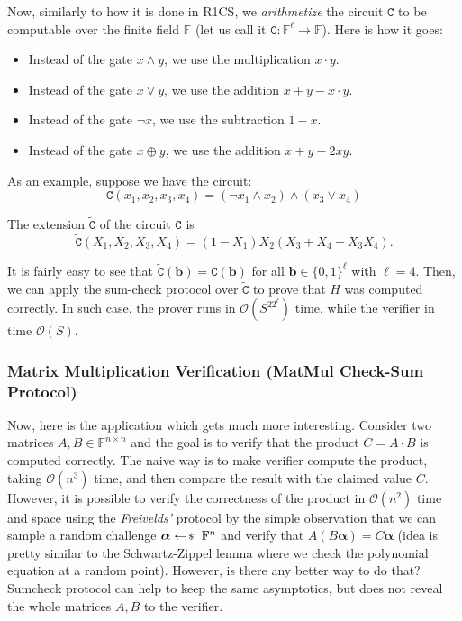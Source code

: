 \documentclass[../../book.tex]{subfiles}
\begin{document}
Now, similarly to how it is done in R1CS, we \textit{arithmetize} the circuit
$\mathtt{C}$ to be computable over the finite field $\mathbb{F}$ (let us call it
$\widetilde{\mathtt{C}}: \mathbb{F}^{\ell} \to \mathbb{F}$). Here is how it goes:
\begin{itemize}
    \item Instead of the gate $x \wedge y$, we use the multiplication $x \cdot y$.
    \item Instead of the gate $x \vee y$, we use the addition $x + y - x \cdot y$.
    \item Instead of the gate $\neg x$, we use the subtraction $1 - x$.
    \item Instead of the gate $x \oplus y$, we use the addition $x + y - 2xy$.
\end{itemize}

As an example, suppose we have the circuit:
\begin{equation*}
    \mathtt{C}(x_1,x_2,x_3,x_4) = (\neg x_1 \wedge x_2) \wedge (x_3 \vee x_4)
\end{equation*}

The extension $\widetilde{\mathtt{C}}$ of the circuit $\mathtt{C}$ is
\begin{equation*}
    \widetilde{\mathtt{C}}(X_1,X_2,X_3,X_4) = (1 - X_1)X_2(X_3 + X_4 - X_3X_4).
\end{equation*}

It is fairly easy to see that $\widetilde{\mathtt{C}}(\boldsymbol{b}) =
\mathtt{C}(\boldsymbol{b})$ for all $\boldsymbol{b} \in \{0,1\}^{\ell}$ with
$\ell=4$. Then, we can apply the sum-check protocol over
$\widetilde{\mathtt{C}}$ to prove that $H$ was computed correctly. In such case,
the prover runs in $\mathcal{O}(S^22^{\ell})$ time, while the verifier in time
$\mathcal{O}(S)$. 

\subsubsection{Matrix Multiplication Verification (MatMul Check-Sum Protocol)}

Now, here is the application which gets much more interesting. Consider two
matrices $A, B \in \mathbb{F}^{n \times n}$ and the goal is to verify that the
product $C = A \cdot B$ is computed correctly. The naive way is to make verifier
compute the product, taking $\mathcal{O}(n^3)$ time, and then compare the result
with the claimed value $C$. However, it is possible to verify the correctness of
the product in $\mathcal{O}(n^2)$ time and space using the \textit{Freivelds'}
protocol by the simple observation that we can sample a random challenge
$\boldsymbol{\alpha} \leftarrowS \mathbb{F}^n$ and verify that
$A(B\boldsymbol{\alpha}) = C\boldsymbol{\alpha}$ (idea is pretty similar
to the Schwartz-Zippel lemma where we check the polynomial equation at a 
random point). However, is there any better way to do that? Sumcheck 
protocol can help to keep the same asymptotics, but does not reveal 
the whole matrices $A,B$ to the verifier.
\end{document}
